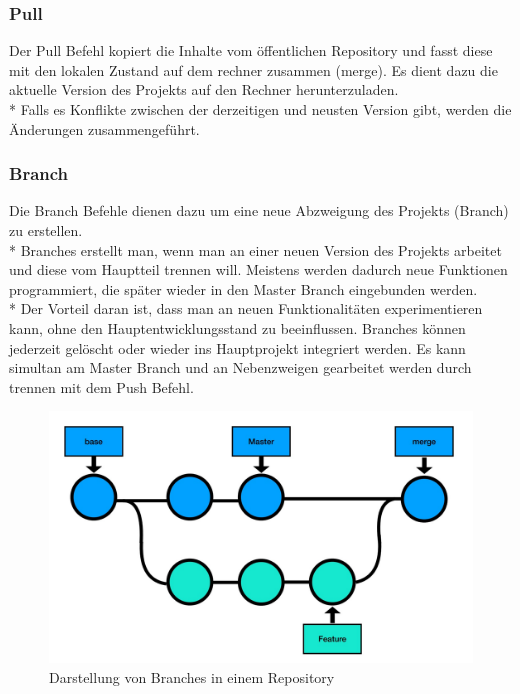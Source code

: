 \subsubsection{Pull}
\label{sec:Pull}
Der Pull Befehl kopiert die Inhalte vom öffentlichen Repository und fasst diese mit den lokalen Zustand auf dem 
rechner zusammen (merge). Es dient dazu die aktuelle Version des Projekts auf den Rechner herunterzuladen.
\\* Falls es Konflikte zwischen der derzeitigen und neusten Version gibt, werden die Änderungen zusammengeführt. \cite{GitCmnds}

\subsubsection{Branch}
\label{sec:Branch}
Die Branch Befehle dienen dazu um eine neue Abzweigung des Projekts (Branch) zu erstellen.
\\*
Branches erstellt man, wenn man an einer neuen Version des Projekts arbeitet und diese vom Hauptteil trennen will.
Meistens werden dadurch neue Funktionen programmiert, die später wieder in den Master Branch eingebunden werden.
\\* Der Vorteil daran ist, dass man an neuen Funktionalitäten experimentieren kann, ohne den Hauptentwicklungsstand zu 
beeinflussen. Branches können jederzeit gelöscht oder wieder ins Hauptprojekt integriert werden.
Es kann simultan am Master Branch und an Nebenzweigen gearbeitet werden durch trennen mit dem Push Befehl. \cite{GitExpl}

\begin{figure}[htp]
    \author{David Ignjatovic}
    \centering
    \includegraphics[scale=0.3]{pics/GitBranches.jpg}
    \caption{Darstellung von Branches in einem Repository}
    \label{fig:impl:GitBranches}
\end{figure}

